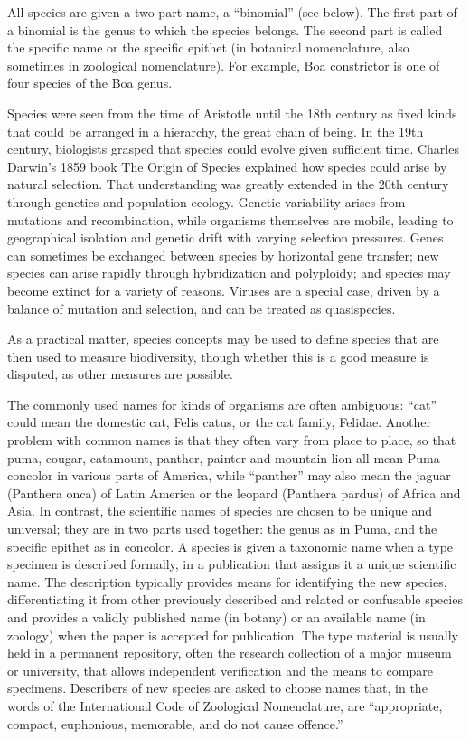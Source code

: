 \documentclass[]{book}
\theoremstyle{definition}
\theoremstyle{definition}
\theoremstyle{definition}
\theoremstyle{remark}
\begin{document}
All species are given a two-part name, a ``binomial'' (see below). The
first part of a binomial is the genus to which the species belongs. The
second part is called the specific name or the specific epithet (in
botanical nomenclature, also sometimes in zoological nomenclature). For
example, Boa constrictor is one of four species of the Boa genus.

Species were seen from the time of Aristotle until the 18th century as
fixed kinds that could be arranged in a hierarchy, the great chain of
being. In the 19th century, biologists grasped that species could evolve
given sufficient time. Charles Darwin's 1859 book The Origin of Species
explained how species could arise by natural selection. That
understanding was greatly extended in the 20th century through genetics
and population ecology. Genetic variability arises from mutations and
recombination, while organisms themselves are mobile, leading to
geographical isolation and genetic drift with varying selection
pressures. Genes can sometimes be exchanged between species by
horizontal gene transfer; new species can arise rapidly through
hybridization and polyploidy; and species may become extinct for a
variety of reasons. Viruses are a special case, driven by a balance of
mutation and selection, and can be treated as quasispecies.

As a practical matter, species concepts may be used to define species
that are then used to measure biodiversity, though whether this is a
good measure is disputed, as other measures are possible.

The commonly used names for kinds of organisms are often ambiguous:
``cat'' could mean the domestic cat, Felis catus, or the cat family,
Felidae. Another problem with common names is that they often vary from
place to place, so that puma, cougar, catamount, panther, painter and
mountain lion all mean Puma concolor in various parts of America, while
``panther'' may also mean the jaguar (Panthera onca) of Latin America or
the leopard (Panthera pardus) of Africa and Asia. In contrast, the
scientific names of species are chosen to be unique and universal; they
are in two parts used together: the genus as in Puma, and the specific
epithet as in concolor. A species is given a taxonomic name when a type
specimen is described formally, in a publication that assigns it a
unique scientific name. The description typically provides means for
identifying the new species, differentiating it from other previously
described and related or confusable species and provides a validly
published name (in botany) or an available name (in zoology) when the
paper is accepted for publication. The type material is usually held in
a permanent repository, often the research collection of a major museum
or university, that allows independent verification and the means to
compare specimens. Describers of new species are asked to choose names
that, in the words of the International Code of Zoological Nomenclature,
are ``appropriate, compact, euphonious, memorable, and do not cause
offence.''
\end{document}
